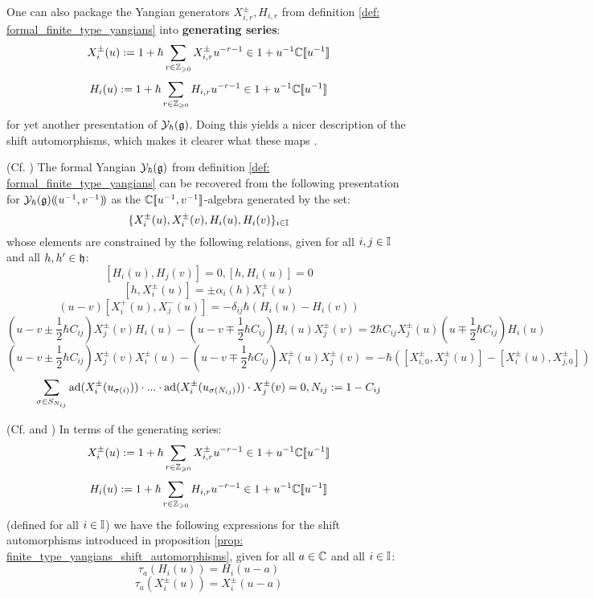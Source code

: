         One can also package the Yangian generators $X_{i, r}^{\pm}, H_{i, r}$ from definition \ref{def: formal_finite_type_yangians} into \textbf{generating  series}:
            $$X_i^{\pm}(u) := 1 + \hbar \sum_{r \in \mathbb{Z}_{\geqslant 0}} X_{i, r}^{\pm} u^{-r - 1} \in 1 + u^{-1} \mathbb{C}[\![u^{-1}]\!]$$
            $$H_i(u) := 1 + \hbar \sum_{r \in \mathbb{Z}_{\geqslant 0}} H_{i, r} u^{-r - 1} \in 1 + u^{-1} \mathbb{C}[\![u^{-1}]\!]$$
        for yet another presentation of $\mathcal{Y}_{\hbar}(\mathfrak{g})$. Doing this yields a nicer description of the shift automorphisms, which makes it clearer what these maps . 
        \begin{proposition} \label{prop: generating_series_for_finite_untwisted_yangians}
            (Cf. \cite[Proposition 2.3]{gautam_and_toledano_laredo_yangians_quantum_loop_algebras_and_abelian_difference_equations}) The formal Yangian $\mathcal{Y}_{\hbar}(\mathfrak{g})$ from definition \ref{def: formal_finite_type_yangians} can be recovered from the following presentation for $\mathcal{Y}_{\hbar}(\mathfrak{g})(\!(u^{-1}, v^{-1})\!)$ as the $\mathbb{C}[\![u^{-1}, v^{-1}]\!]$-algebra generated by the set:
                $$\{X_i^{\pm}(u), X_i^{\pm}(v), H_i(u), H_i(v)\}_{i \in \mathbb{I}}$$
            whose elements are constrained by the following relations, given for all $i, j \in \mathbb{I}$ and all $h, h' \in \mathfrak{h}$:
                $$[H_i(u), H_j(v)] = 0, [h, H_i(u)] = 0$$
                $$[h, X_i^{\pm}(u)] = \pm \alpha_i(h) X_i^{\pm}(u)$$
                $$(u - v) [X_i^+(u), X_j^-(u)] = -\delta_{ij} \hbar ( H_i(u) - H_i(v) )$$
                $$\left(u - v \pm \frac12 \hbar C_{ij}\right) X_j^{\pm}(v) H_i(u) - \left(u - v \mp  \frac12 \hbar C_{ij}\right) H_i(u) X_j^{\pm}(v) = 2 \hbar C_{ij} X_j^{\pm}(u) \left(u \mp \frac12 \hbar C_{ij}\right) H_i(u)$$
                $$\left(u - v \pm \frac12 \hbar C_{ij}\right) X_j^{\pm}(v) X_i^{\pm}(u) - \left(u - v \mp \frac12 \hbar C_{ij}\right) X_i^{\pm}(u) X_j^{\pm}(v) = -\hbar( [X_{i, 0}^{\pm}, X_j^{\pm}(u)] - [X_i^{\pm}(u), X_{j, 0}^{\pm}] )$$
                $$\sum_{\sigma \in S_{N_{ij}}} \mathrm{ad}( X_i^{\pm}( u_{\sigma(i)} ) ) \cdot ... \cdot \mathrm{ad}( X_i^{\pm}( u_{\sigma(N_{ij})} ) ) \cdot X_j^{\pm}(v) = 0, N_{ij} := 1 - C_{ij}$$
        \end{proposition}
        \begin{proposition} \label{prop: shift_automorphisms_via_generating_series}
            (Cf. \cite[Subsection 2.8]{gautam_and_toledano_laredo_yangians_quantum_loop_algebras_and_abelian_difference_equations} and \cite[Remark 2.4]{wendlandt_formal_shift_operators_on_yangian_doubles}) In terms of the generating series:
                $$X_i^{\pm}(u) := 1 + \hbar \sum_{r \in \mathbb{Z}_{\geqslant 0}} X_{i, r}^{\pm} u^{-r - 1} \in 1 + u^{-1} \mathbb{C}[\![u^{-1}]\!]$$
                $$H_i(u) := 1 + \hbar \sum_{r \in \mathbb{Z}_{\geqslant 0}} H_{i, r} u^{-r - 1} \in 1 + u^{-1} \mathbb{C}[\![u^{-1}]\!]$$
            (defined for all $i \in \mathbb{I}$) we have the following expressions for the shift automorphisms introduced in proposition \ref{prop: finite_type_yangians_shift_automorphisms}, given for all $a \in \mathbb{C}$ and all $i \in \mathbb{I}$:
                $$\tau_a(H_i(u)) = H_i(u - a)$$
                $$\tau_a(X_i^{\pm}(u)) = X_i^{\pm}(u - a)$$
        \end{proposition}
